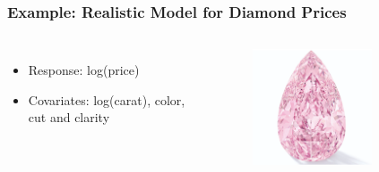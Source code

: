 \documentclass[
    utf8,
    aspectratio=169
]{beamer}  %
\begin{document}
\begin{frame}
	\frametitle{Example: Realistic Model for Diamond Prices}
	\begin{columns}
		\begin{itemize}
			\item Response: log(price)
			\item Covariates: log(carat), color, cut and clarity
		\end{itemize}
	
		\begin{figure}
			\includegraphics[width=0.7\textwidth]{pics/dia2.png}
		\end{figure}
	\end{columns}
\end{frame}
\end{document}
